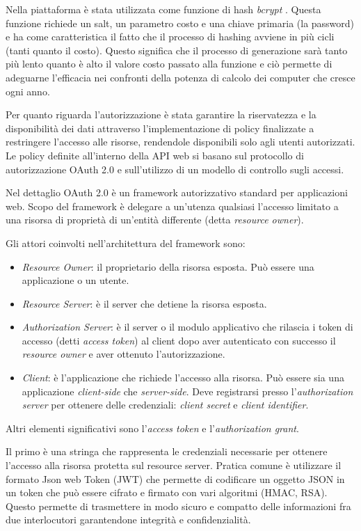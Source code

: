 Nella piattaforma è stata utilizzata come funzione di hash \textit{bcrypt} \cite{bcrypt}. Questa funzione richiede un salt, un parametro costo e una chiave primaria (la password) e ha come
caratteristica il fatto che il processo di hashing avviene in più cicli (tanti quanto il costo). Questo significa che il processo di generazione sarà tanto più lento quanto è alto il valore
costo passato alla funzione e ciò permette di adeguarne l'efficacia nei confronti della potenza di calcolo dei computer che cresce ogni anno.

Per quanto riguarda l'autorizzazione è stata garantire la riservatezza e la disponibilità dei dati
attraverso l'implementazione di policy finalizzate a restringere l'accesso alle risorse,
rendendole disponibili solo agli utenti autorizzati.
Le policy definite all'interno della API web si basano sul protocollo di autorizzazione OAuth 2.0 \cite{rfc6749} e sull'utilizzo di un
modello di controllo sugli accessi.

Nel dettaglio OAuth 2.0 è un framework autorizzativo standard per applicazioni web.
Scopo del framework è delegare a un'utenza qualsiasi l'accesso limitato a una risorsa di proprietà di un'entità differente (detta \textit{resource owner}).

Gli attori coinvolti nell'architettura del framework sono:
\begin{itemize}
    \itemsep0em
    \item \textit{Resource Owner}: il proprietario della risorsa esposta. Può essere una applicazione o un utente.
    \item \textit{Resource Server}: è il server che detiene la risorsa esposta.
    \item \textit{Authorization Server}: è il server o il modulo applicativo che rilascia i token di accesso (detti \textit{access token}) al client dopo aver
          autenticato con successo il \textit{resource owner} e aver ottenuto l'autorizzazione.
    \item  \textit{Client}: è l'applicazione che richiede l'accesso alla risorsa. Può essere sia una applicazione \textit{client-side} che \textit{server-side}.
          Deve registrarsi presso l'\textit{authorization server} per ottenere delle credenziali: \textit{client secret} e \textit{client identifier}.
\end{itemize}

Altri elementi significativi sono l'\textit{access token} e l'\textit{authorization grant}.

Il primo è una stringa che rappresenta le credenziali necessarie per ottenere l'accesso alla risorsa protetta sul resource server.
Pratica comune è utilizzare il formato Json web Token \cite{rfc7519} (JWT) che permette di codificare un oggetto JSON in un token
che può essere cifrato e firmato con vari algoritmi (HMAC, RSA). Questo permette di trasmettere in modo sicuro e compatto delle informazioni
fra due interlocutori garantendone integrità e confidenzialità.

